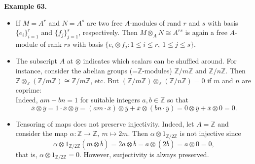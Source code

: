 \documentclass[12pt,a4paper,footinclude=true,headinclude=true]{scrbook} %
\newenvironment{example}[2][Example]
    { \begin{mdframed}[backgroundcolor=gray!20] \textbf{#1 #2.} }
    {  \end{mdframed}}
\begin{document}
\begin{example}{63}
    \begin{itemize}
        \item[(a)] If $M=A^r$ and $N=A^s$ are two free $A$-modules of rand $r$ and $s$ with basis $\{e_i\}_{i=1}^r$ and $\{f_j\}_{j=1}^s$, respectively. Then $M\otimes_AN\cong A^{rs}$ is again a free $A$-module of rank $rs$ with basis $\{e_i\otimes f_j:1\leq i\leq r,\ 1\leq j\leq s\}$.
        \newpage
        \item[(b)] The subscript $A$ at $\otimes$ indicates which scalars can be shuffled around. For instance, consider the abelian groups (=$\mathbb{Z}$-modules) $\mathbb{Z}/m\mathbb{Z}$ and $\mathbb{Z}/n\mathbb{Z}$. Then $\mathbb{Z}\otimes_{\mathbb{Z}}(\mathbb{Z}/m\mathbb{Z})\cong \mathbb{Z}/m\mathbb{Z}$, etc. But $(\mathbb{Z}/m\mathbb{Z})\otimes_{\mathbb{Z}}(\mathbb{Z}/n\mathbb{Z})=0$ if $m$ and $n$ are coprime:\\
        Indeed, $am+bn=1$ for suitable integers $a,b\in\mathbb{Z}$ so that 
        \begin{equation*}
            \overline{x}\otimes\overline{y}=1\cdot\overline{x}\otimes\overline{y}=(am\cdot\overline{x})\otimes\overline{y}+\overline{x}\otimes(bn\cdot\overline{y})=0\otimes\overline{y}+\overline{x}\otimes0=0.
        \end{equation*}
        \item[(c)] Tensoring of maps does not preserve injectivity. Indeed, let $A=\mathbb{Z}$ and consider the map $\alpha:\mathbb{Z}\to\mathbb{Z},\ m\mapsto2m$. Then $\alpha\otimes1_{\mathbb{Z}/2\mathbb{Z}}$ is not injective since
        \begin{equation*}
            \alpha\otimes1_{\mathbb{Z}/2\mathbb{Z}}(m\otimes\overline{b})=2a\otimes\overline{b}=a\otimes(2\overline{b})=a\otimes0=0,
        \end{equation*}
        that is, $\alpha\otimes1_{\mathbb{Z}/2\mathbb{Z}}=0$. However, surjectivity is always preserved.
    \end{itemize}
\end{example}
\end{document}
